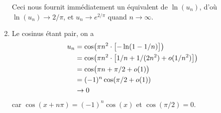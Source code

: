 \documentclass{yann}
\begin{document}
\begin{enumerate}
  Ceci nous fournit immédiatement un équivalent de $\ln(u_n)$, d'où $\ln(u_n) \to 2/\pi$,
  et $u_n \to e^{2/\pi}$ quand $n\to\infty$.

\item
  Le cosinus étant pair, on a
  \begin{align*}
  u_n &= \cos\bigl({\pi n^2 \cdot \bigl[{ -\ln(1-1/n) }\bigr]}\bigr) \\
      &= \cos\bigl({\pi n^2 \cdot \bigl[{ 1/n + 1/(2n^2) + o(1/n^2)}\bigr]}\bigr) \\
      &= \cos\bigl({\pi n + \pi/2 + o(1)}\bigr) \\
      &= (-1)^n \cos(\pi/2 + o(1)) \\
      &\to 0
  \end{align*}
  car $\cos(x+n\pi) = (-1)^n \cos(x)$ et $\cos(\pi/2) = 0$.
\end{enumerate}
\end{document}
